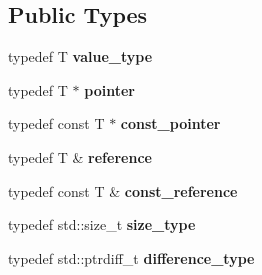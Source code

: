 \subsection*{Public Types}
\begin{DoxyCompactItemize}
\item 
typedef T {\bfseries value\+\_\+type}\hypertarget{classKFPSimdAllocator_a2220f8e8df85a28528c3b638d6d3326e}{}\label{classKFPSimdAllocator_a2220f8e8df85a28528c3b638d6d3326e}

\item 
typedef T $\ast$ {\bfseries pointer}\hypertarget{classKFPSimdAllocator_a3be67dc1570711f43bffb59df7a101fb}{}\label{classKFPSimdAllocator_a3be67dc1570711f43bffb59df7a101fb}

\item 
typedef const T $\ast$ {\bfseries const\+\_\+pointer}\hypertarget{classKFPSimdAllocator_a9838e96bfdcbad5ea6a8f6634b0efec0}{}\label{classKFPSimdAllocator_a9838e96bfdcbad5ea6a8f6634b0efec0}

\item 
typedef T \& {\bfseries reference}\hypertarget{classKFPSimdAllocator_af718c8189940e57744a409091aa768b1}{}\label{classKFPSimdAllocator_af718c8189940e57744a409091aa768b1}

\item 
typedef const T \& {\bfseries const\+\_\+reference}\hypertarget{classKFPSimdAllocator_a545bff14e608d6a5d405f75cd9d7b3ec}{}\label{classKFPSimdAllocator_a545bff14e608d6a5d405f75cd9d7b3ec}

\item 
typedef std\+::size\+\_\+t {\bfseries size\+\_\+type}\hypertarget{classKFPSimdAllocator_a693ced984b2b34276785ff5bc27b5814}{}\label{classKFPSimdAllocator_a693ced984b2b34276785ff5bc27b5814}

\item 
typedef std\+::ptrdiff\+\_\+t {\bfseries difference\+\_\+type}\hypertarget{classKFPSimdAllocator_ab2c1ad95cf013d9239f090a5e695c38b}{}\label{classKFPSimdAllocator_ab2c1ad95cf013d9239f090a5e695c38b}

\end{DoxyCompactItemize}
